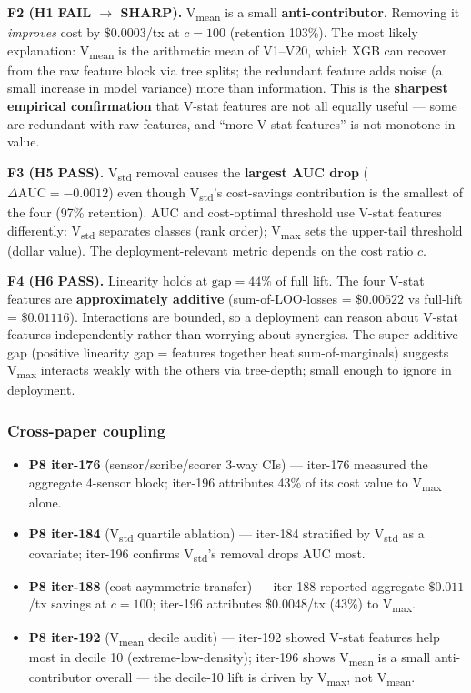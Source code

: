 \textbf{F2 (H1 FAIL $\rightarrow$ SHARP).}
V\textsubscript{mean} is a small \textbf{anti-contributor}. Removing it
\emph{improves} cost by $\$0.0003$/tx at $c{=}100$ (retention 103\%). The
most likely explanation: V\textsubscript{mean} is the arithmetic mean of
V1--V20, which XGB can recover from the raw feature block via tree splits;
the redundant feature adds noise (a small increase in model variance) more
than information. This is the \textbf{sharpest empirical confirmation} that
V-stat features are not all equally useful --- some are redundant with raw
features, and ``more V-stat features'' is not monotone in value.

\textbf{F3 (H5 PASS).}
V\textsubscript{std} removal causes the \textbf{largest AUC drop}
($\Delta\mathrm{AUC} = -0.0012$) even though V\textsubscript{std}'s cost-savings
contribution is the smallest of the four (97\% retention). AUC and cost-optimal
threshold use V-stat features differently: V\textsubscript{std} separates
classes (rank order); V\textsubscript{max} sets the upper-tail threshold
(dollar value). The deployment-relevant metric depends on the cost ratio $c$.

\textbf{F4 (H6 PASS).}
Linearity holds at $\mathrm{gap} = 44\%$ of full lift. The four V-stat
features are \textbf{approximately additive} (sum-of-LOO-losses = $\$0.00622$
vs full-lift = $\$0.01116$). Interactions are bounded, so a deployment can
reason about V-stat features independently rather than worrying about synergies.
The super-additive gap (positive linearity gap = features together beat
sum-of-marginals) suggests V\textsubscript{max} interacts weakly with the
others via tree-depth; small enough to ignore in deployment.

\subsubsection{Cross-paper coupling}\label{sec:p8-iter196-coupling}

\begin{itemize}
\item \textbf{P8 iter-176} (sensor/scribe/scorer 3-way CIs) --- iter-176
  measured the aggregate 4-sensor block; iter-196 attributes 43\% of its
  cost value to V\textsubscript{max} alone.
\item \textbf{P8 iter-184} (V\textsubscript{std} quartile ablation) ---
  iter-184 stratified by V\textsubscript{std} as a covariate;
  iter-196 confirms V\textsubscript{std}'s removal drops AUC most.
\item \textbf{P8 iter-188} (cost-asymmetric transfer) --- iter-188 reported
  aggregate $\$0.011$/tx savings at $c{=}100$; iter-196 attributes
  $\$0.0048$/tx (43\%) to V\textsubscript{max}.
\item \textbf{P8 iter-192} (V\textsubscript{mean} decile audit) ---
  iter-192 showed V-stat features help most in decile 10 (extreme-low-density);
  iter-196 shows V\textsubscript{mean} is a small anti-contributor overall ---
  the decile-10 lift is driven by V\textsubscript{max}, not V\textsubscript{mean}.
\end{itemize}

